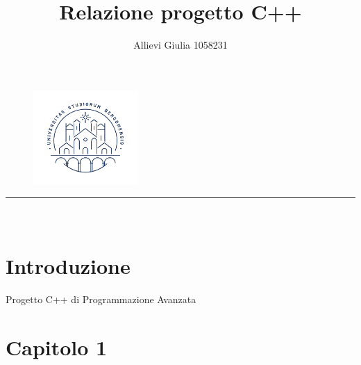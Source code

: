 \documentclass[a4paper,12pt]{article}
\title{\Huge\textbf{Relazione progetto C++\\}} %
\date{}
\author{\Large Allievi Giulia 1058231 \\[0.3cm]
}
\begin{document}
\maketitle %

\begin{figure}[h]
\centering
\includegraphics[width=4cm]{immagini/imgproj}
\end{figure}

\hrule



\section*{\\[0.7cm] Introduzione} 
Progetto C++ di Programmazione Avanzata


\clearpage
\newpage
\section*{Capitolo 1} %


\end{document}
